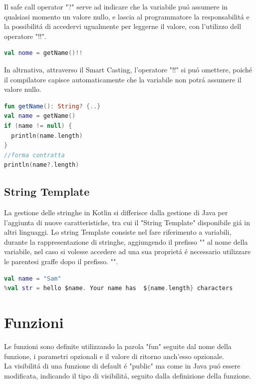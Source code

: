 Il safe call operator "?" serve ad indicare che la variabile pu\'o assumere in qualsiasi momento un valore nullo, e lascia al programmatore la responsabilit\'a e la possibilit\'a di accedervi ugualmente per leggerne il valore, con l'utilizzo dell operatore "!!".


\begin{lstlisting}[language=kotlin,caption={Esempio !!}]
val nome = getName()!!
\end{lstlisting}

In altrnativa, attraverso il Smart Casting, l'operatore "!!" si pu\'o omettere, poich\'e il compilatore capisce automaticamente che la variabile non potr\'a assumere il valore nullo.

\begin{lstlisting}[language=kotlin,caption={Smart Casting}]
fun getName(): String? {..}
val name = getName()
if (name != null) {
  println(name.length)
}
//forma contratta
println(name?.length)
\end{lstlisting}

\subsection{String Template}
La gestione delle stringhe in Kotlin si differisce dalla gestione di Java per l'aggiunta di nuove caratteristiche, tra cui il "String Template" disponibile gi\'a in altri linguaggi.
Lo string Template consiste nel fare riferimento a variabili, durante la rappresentazione di stringhe, aggiungendo il prefisso  "\textdollar" al nome della variabile, nel caso si volesse accedere ad una sua propriet\'a \'e necessario utilizzare le parentesi graffe dopo il prefisso. "\textdollar".


\begin{lstlisting}[language=kotlin,caption={Esempio String template}]
val name = "Sam"
%val str = hello $name. Your name has  ${name.length} characters
\end{lstlisting}




\section{Funzioni}
Le funzioni sono definite utilizzando la parola "fun" seguite dal nome della funzione, i parametri opzionali e il valore di ritorno anch'esso opzionale.\\
La visibilit\'a di una funzione di default \'e "public" ma come in Java pu\'o essere modificata, indicando il tipo di visibilit\'a, seguito dalla definizione della funzione.

